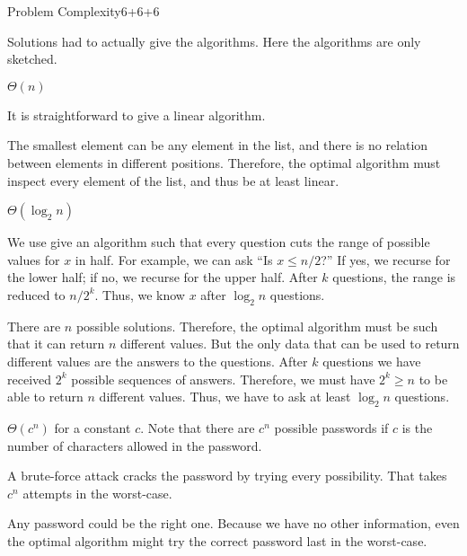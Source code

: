 \documentclass[a4paper]{article}
\begin{document}
\begin{problem}{Problem Complexity}{6+6+6}
\begin{solution}
Solutions had to actually give the algorithms. Here the algorithms are only sketched.
\begin{compactenum}
\item $\Theta(n)$
	\begin{compactitem}
	\item It is straightforward to give a linear algorithm.
	\item The smallest element can be any element in the list, and there is no relation between elements in different positions.
	Therefore, the optimal algorithm must inspect every element of the list, and thus be at least linear.
	\end{compactitem}
\item $\Theta(\log_2 n)$
	\begin{compactitem}
	\item We use give an algorithm such that every question cuts the range of possible values for $x$ in half.
	For example, we can ask ``Is $x\leq n/2$?'' If yes, we recurse for the lower half; if no, we recurse for the upper half.
	After $k$ questions, the range is reduced to $n/2^k$. Thus, we know $x$ after $\log_2 n$ questions.
	\item There are $n$ possible solutions. Therefore, the optimal algorithm must be such that it can return $n$ different values.
	But the only data that can be used to return different values are the answers to the questions.
	After $k$ questions we have received $2^k$ possible sequences of answers.
	Therefore, we must have $2^k\geq n$ to be able to return $n$ different values.
	Thus, we have to ask at least $\log_2 n$ questions.
	\end{compactitem}
\item $\Theta(c^n)$ for a constant $c$. Note that there are $c^n$ possible passwords if $c$ is the number of characters allowed in the password.
	\begin{compactitem}
	\item A brute-force attack cracks the password by trying every possibility. That takes $c^n$ attempts in the worst-case.
	\item Any password could be the right one.
	Because we have no other information, even the optimal algorithm might try the correct password last in the worst-case.
	\end{compactitem}
\end{compactenum}
\end{solution}
\end{problem}
\end{document}
